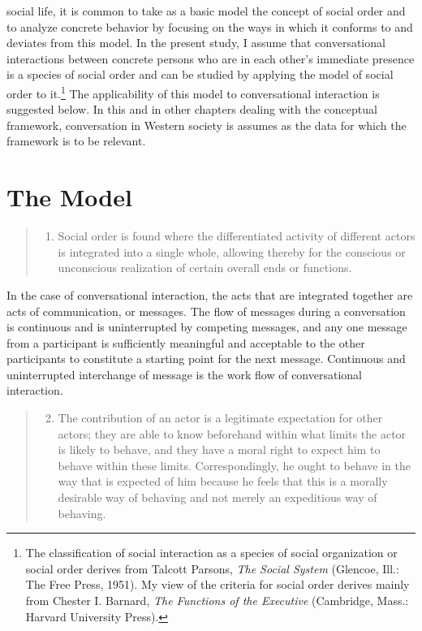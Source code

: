 \documentclass[openany,nobib]{tufte-book}
\begin{document}
social life, it is common to take as a basic model the
concept of social order and to analyze concrete behavior by focusing on
the ways in which it conforms to and deviates from this model. In the
present study, I assume that conversational interactions between
concrete persons who are in each other's immediate presence is a species
of social order and can be studied by applying the model of social order
to it.\footnote{The classification of social interaction as a species of
  social organization or social order derives from Talcott Parsons,
  \emph{The Social System} (Glencoe, Ill.: The Free Press, 1951). My
  view of the criteria for social order derives mainly from Chester I.
  Barnard, \emph{The Functions of the Executive} (Cambridge, Mass.:
  Harvard University Press).} The applicability of this model to
conversational interaction is suggested below. In this and in other
chapters dealing with the conceptual framework, conversation in Western
society is assumes as the data for which the framework is to be
relevant.

\hypertarget{the-model}{%
\section{The Model}\label{the-model}}

\begin{quote}
\begin{enumerate}
\item
  Social order is found where the differentiated activity of different
  actors is integrated into a single whole, allowing thereby for the
  conscious or unconscious realization of certain overall ends or
  functions.
\end{enumerate}
\end{quote}

\noindent In the case of conversational interaction, the acts that are integrated
together are acts of communication, or messages. The flow of messages
during a conversation is continuous and is uninterrupted by competing
messages, and any one message from a participant is sufficiently
meaningful and acceptable to the other participants to constitute a
starting point for the next message. Continuous and uninterrupted
interchange of message is the work flow of conversational interaction.

\begin{quote}
\begin{enumerate}
\setcounter{enumi}{1}
\item
  The contribution of an actor is a legitimate expectation for other
  actors; they are able to know beforehand within what limits the actor
  is likely to behave, and they have a moral right to expect him to
  behave within these limits. Correspondingly, he ought to behave in the
  way that is expected of him because he feels that this is a morally
  desirable way of behaving and not merely an expeditious way of
  behaving.
\end{enumerate}
\end{quote}
\end{document}
